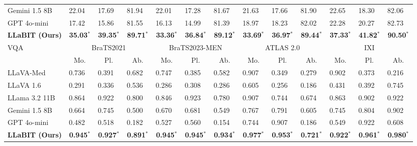\begin{table}[t]
{\begin{tabular}{l|ccc|ccc|ccc|ccc}
        \small Gemini 1.5 8B                       & 22.04  \ & 17.69 \ & 81.94 \ & 22.01 \ & 17.28 \ & 81.67 \ & 21.63 \ & 17.66 \ & 81.90 \ & 22.65 \ & 18.30 \ & 82.06 \ \\
        \small GPT 4o-mini                               & 17.42  \ & 15.86 \ & 81.55 \ & 16.13 \ & 14.99 \ & 81.39 \ & 18.97 \ & 18.23 \ & 82.02 \ & 22.28 \ & 20.27 \ & 82.73 \ \\
        \rowcolor{gray!10} \small \textbf{LLaBIT (Ours)} & \textbf{35.03}$^*$ & \textbf{39.35}$^*$ & \textbf{89.71}$^*$ & \textbf{33.36}$^*$ & \textbf{36.84}$^*$ & \textbf{89.12}$^*$ & \textbf{33.69}$^*$ & \textbf{36.97}$^*$ & \textbf{89.44}$^*$ & \textbf{37.33}$^*$ & \textbf{41.82}$^*$ & \textbf{90.50}$^*$ \\
        \bottomrule
        \toprule
        \multirow{2}{*}{VQA} &  \multicolumn{3}{c|}{BraTS2021}  & \multicolumn{3}{c|}{BraTS2023-MEN}  &  \multicolumn{3}{c|}{ATLAS 2.0} & \multicolumn{3}{c}{IXI}  \\
         & Mo. & Pl. & Ab. & Mo. & Pl. & Ab. & Mo. & Pl. & Ab. & Mo. & Pl. & Ab.  \\
        \midrule
        \small LLaVA-Med                                 & 0.736 \ & 0.391 \ & 0.682 \ & 0.747 \ & 0.385 \ & 0.582 \ & 0.907 \ & 0.349 \ & 0.279 \ & 0.902 \ & 0.373 \ & 0.216 \ \\
        \small LLaVA 1.6                                 & 0.291 \ & 0.336 \ & 0.536 \ & 0.286 \ & 0.308 \ & 0.286 \ & 0.605 \ & 0.256 \ & 0.186 \ & 0.431 \ & 0.392 \ & 0.745 \ \\
        \small LLama 3.2 11B                             & 0.864 \ & 0.922 \ & 0.800 \ & 0.846 \ & 0.923 \ & 0.780 \ & 0.907 \ & 0.744 \ & 0.674 \ & 0.863 \ & 0.902 \ & 0.922 \ \\
        \small Gemini 1.5 8B                       & 0.664 \ & 0.745 \ & 0.500 \ & 0.670 \ & 0.681 \ & 0.549 \ & 0.767 \ & 0.791 \ & 0.605 \ & 0.745 \ & 0.804 \ & 0.902 \ \\
        \small GPT 4o-mini                               & 0.482 \ & 0.518 \ & 0.182 \ & 0.527 \ & 0.560 \ & 0.154 \ & 0.744 \ & 0.907 \ & 0.186 \ & 0.549 \ & 0.922 \ & 0.608 \ \\
        \rowcolor{gray!10} \small \textbf{LLaBIT (Ours)} & \textbf{0.945}$^*$ & \textbf{0.927}$^*$ & \textbf{0.891}$^*$ & \textbf{0.945}$^*$ & \textbf{0.945}$^*$ & \textbf{0.934}$^*$ & \textbf{0.977}$^*$ & \textbf{0.953}$^*$ & \textbf{0.721}$^*$ & \textbf{0.922}$^*$ & \textbf{0.961}$^*$ & \textbf{0.980}$^*$ \\
        \bottomrule
    \end{tabular}
    }
    \vspace{-6pt}
\end{table}
  

